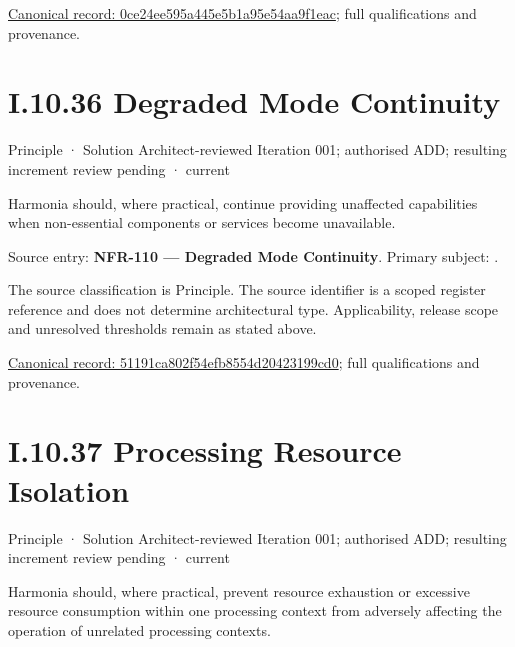 {\footnotesize \href{../../../../../../../../continuum/motivation/principle/architectural-axiom/0ce24ee595a445e5b1a95e54aa9f1eac.md}{Canonical record: 0ce24ee595a445e5b1a95e54aa9f1eac}; full qualifications and provenance.}\par
\section*{I.10.36 Degraded Mode Continuity}
\label{navigation:I.10.36}

\label{element:51191ca802f54efb8554d20423199cd0}
{\small Principle · Solution Architect-reviewed Iteration 001; authorised ADD; resulting increment review pending · current}\par

Harmonia should, where practical, continue providing unaffected capabilities when non-essential components or services become unavailable.



Source entry: \textbf{NFR-110 — Degraded Mode Continuity}. Primary subject: \texttt{}.



The source classification is Principle. The source identifier is a scoped register reference and does not determine architectural type. Applicability, release scope and unresolved thresholds remain as stated above.


{\footnotesize \href{../../../../../../../../continuum/motivation/principle/51191ca802f54efb8554d20423199cd0.md}{Canonical record: 51191ca802f54efb8554d20423199cd0}; full qualifications and provenance.}\par
\section*{I.10.37 Processing Resource Isolation}
\label{navigation:I.10.37}

\label{element:41ce95e00e064d809ad4bda818705510}
{\small Principle · Solution Architect-reviewed Iteration 001; authorised ADD; resulting increment review pending · current}\par

Harmonia should, where practical, prevent resource exhaustion or excessive resource consumption within one processing context from adversely affecting the operation of unrelated processing contexts.



